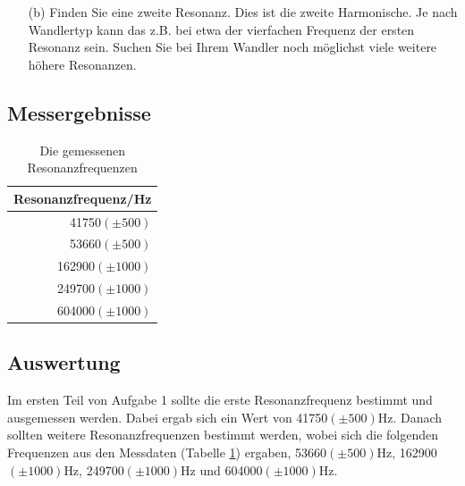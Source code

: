\documentclass[12pt]{scrartcl}
\begin{document}
\begin{itemize}
\begin{figure}[htbp]
  	\caption[Schaltskizze des Versuchsaufbaus]{Schaltskizze des Versuchsaufbaus\footnotemark}
  \label{fig:impedanz}
\end{figure}
Der Spannungsabfall über dem 1-k$\Omega$-Widerstand ist proportional zum Strom durch den Ultraschallwandler, der seinerseits umgekehrt proportional zu dessen Impedanz ist (wenn man davon ausgeht, das die Gesamtimpedanz groß gegen 1 k$\Omega$ ist).
Variieren Sie die Frequenz des Funktionsgenerators und messen Sie die niedrigste Resonanzfrequenz (etwa 40 kHz)
aus. Erwarten Sie im Resonanzfall den maximalen oder minimalen Strom durch den 1-k$\Omega$-Widerstand? 
\item[(b)]
Finden Sie eine zweite Resonanz. Dies ist die zweite Harmonische. Je nach Wandlertyp kann das z.B. bei etwa der vierfachen Frequenz der ersten Resonanz sein. Suchen Sie bei Ihrem Wandler noch möglichst viele weitere höhere
Resonanzen.
\end{itemize}
\subsection{Messergebnisse}
\begin{table}[H]
\caption{Die gemessenen Resonanzfrequenzen}
\begin{center}
\begin{tabular}{|r|}
\hline
Resonanzfrequenz/Hz \\ \hline
41750$(\pm 500)$ \\ \hline
53660$(\pm 500)$ \\ \hline
162900$(\pm 1000)$ \\ \hline
249700$(\pm 1000)$ \\ \hline
604000$(\pm 1000)$ \\ \hline
\end{tabular}
\end{center}
\label{tab:aufgabe1}
\end{table}
\subsection{Auswertung}
Im ersten Teil von Aufgabe 1 sollte die erste Resonanzfrequenz bestimmt und ausgemessen werden. Dabei ergab sich ein Wert von 41750$(\pm 500)$Hz. Danach sollten weitere Resonanzfrequenzen bestimmt werden, wobei sich die folgenden Frequenzen  aus den Messdaten (Tabelle \ref{tab:aufgabe1}) ergaben, 53660$(\pm 500)$Hz, 162900$(\pm 1000)$Hz, 249700$(\pm 1000)$Hz und 604000$(\pm 1000)$Hz.
\end{document}
